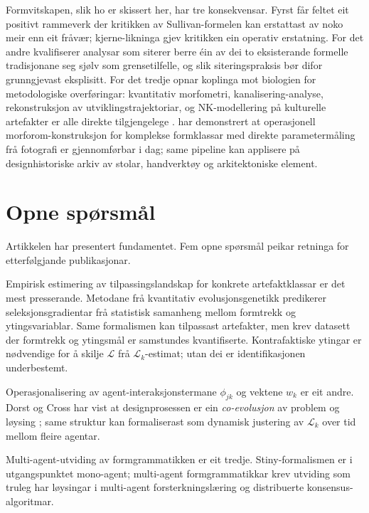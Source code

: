 \documentclass[11pt,a4paper]{article}
\begin{document}
Formvitskapen, slik ho er skissert her, har tre konsekvensar. Fyrst får feltet eit positivt rammeverk der kritikken av Sullivan-formelen kan erstattast av noko meir enn eit fråvær; kjerne-likninga gjev kritikken ein operativ erstatning. For det andre kvalifiserer analysar som siterer berre éin av dei to eksisterande formelle tradisjonane seg sjølv som grensetilfelle, og slik siteringspraksis bør difor grunngjevast eksplisitt. For det tredje opnar koplinga mot biologien for metodologiske overføringar: kvantitativ morfometri, kanalisering-analyse, rekonstruksjon av utviklingstrajektoriar, og NK-modellering på kulturelle artefakter er alle direkte tilgjengelege \citep{wright1932, lande1979, arnold2001, wagner2005, mcghee2007, polly2016}. \citet{contrerasfigueroa2023} har demonstrert at operasjonell morforom-konstruksjon for komplekse formklassar med direkte parametermåling frå fotografi er gjennomførbar i dag; same pipeline kan applisere på designhistoriske arkiv av stolar, handverktøy og arkitektoniske element.

\section{Opne spørsmål}

Artikkelen har presentert fundamentet. Fem opne spørsmål peikar retninga for etterfølgjande publikasjonar.

Empirisk estimering av tilpassingslandskap for konkrete artefaktklassar er det mest presserande. Metodane frå kvantitativ evolusjonsgenetikk \citep{lande1979, arnold2001} predikerer seleksjonsgradientar frå statistisk samanheng mellom formtrekk og ytingsvariablar. Same formalismen kan tilpassast artefakter, men krev datasett der formtrekk og ytingsmål er samstundes kvantifiserte. Kontrafaktiske ytingar er nødvendige for å skilje $\mathcal{L}$ frå $\mathcal{L}_k$-estimat; utan dei er identifikasjonen underbestemt.

Operasjonalisering av agent-interaksjonstermane $\phi_{jk}$ og vektene $w_k$ er eit andre. Dorst og Cross har vist at designprosessen er ein \textit{co-evolusjon} av problem og løysing \citep{dorstcross2001}; same struktur kan formaliserast som dynamisk justering av $\mathcal{L}_k$ over tid mellom fleire agentar.

Multi-agent-utviding av formgrammatikken er eit tredje. Stiny-formalismen \citep{stiny2006} er i utgangspunktet mono-agent; multi-agent formgrammatikkar krev utviding som truleg har løysingar i multi-agent forsterkningslæring og distribuerte konsensus-algoritmar.
\end{document}
